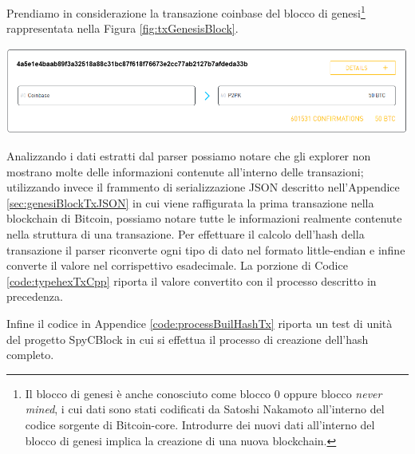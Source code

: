 \begin{example}

Prendiamo in considerazione la transazione coinbase del blocco di genesi\footnote{Il blocco di genesi è anche conosciuto come blocco 0 oppure blocco \emph{never mined}, i cui dati sono stati codificati da Satoshi Nakamoto all'interno del codice sorgente di Bitcoin-core. Introdurre dei nuovi dati all'interno del blocco di genesi implica la creazione di una nuova blockchain.} rappresentata nella Figura \ref{fig:txGenesisBlock}.

{\centering
\vspace{15pt}
\includegraphics[scale=0.35]{images/coinbase_tx_genesis_block.png}
\vspace{10pt}
\par}

Analizzando i dati estratti dal parser possiamo notare che gli explorer non mostrano molte delle informazioni contenute all'interno delle transazioni; utilizzando invece il frammento di serializzazione JSON descritto nell'Appendice \ref{sec:genesiBlockTxJSON} in cui viene raffigurata la prima transazione nella blockchain di Bitcoin, possiamo notare tutte le informazioni realmente contenute nella struttura di una transazione.
Per effettuare il calcolo dell'hash della transazione il parser riconverte ogni tipo di dato nel formato little-endian e infine converte il valore nel corrispettivo esadecimale. La porzione di Codice \ref{code:typehexTxCpp} riporta il valore convertito con il processo descritto in precedenza.



Infine il codice in Appendice \ref{code:processBuilHashTx} riporta un test di unità del progetto SpyCBlock in cui si effettua il processo di creazione dell'hash completo.


\end{example}
